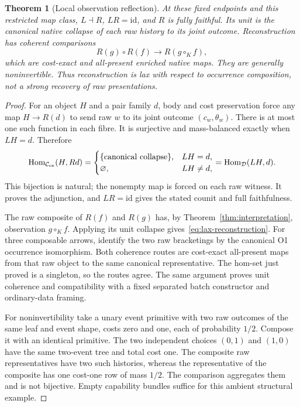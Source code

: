 \documentclass[11pt,a4paper]{article}
\newtheorem{theorem}{Theorem}[section]
\theoremstyle{definition}
\newcommand{\id}{\mathrm{id}}
\begin{document}
\begin{theorem}[Local observation reflection]\label{thm:reflection}
At these fixed endpoints and this restricted map class, $L\dashv R$,
$LR=\id$, and $R$ is fully faithful. Its unit is the canonical native
collapse of each raw history to its joint outcome. Reconstruction has
coherent comparisons
\begin{equation}\label{eq:lax-reconstruction}
 R(g)\circ R(f)\longrightarrow R(g\circ_K f),
\end{equation}
which are cost-exact and all-present enriched native maps. They are
generally noninvertible. Thus reconstruction is lax with respect to
occurrence composition, not a strong recovery of raw presentations.
\end{theorem}
\begin{proof}
For an object $H$ and a pair family $d$, body and cost preservation force
any map $H\to R(d)$ to send raw $w$ to its joint outcome
$(c_w,\theta_w)$. There is at most one such function in each fibre.
It is surjective and mass-balanced exactly when $LH=d$. Therefore
\[
 \operatorname{Hom}_{\mathcal C_{\rm ex}}(H,Rd)
  =\begin{cases}\{\text{canonical collapse}\},&LH=d,\\
                \varnothing,&LH\neq d,
    \end{cases}
 =\operatorname{Hom}_{\mathcal D}(LH,d).
\]
This bijection is natural; the nonempty map is forced on each raw
witness. It proves the adjunction, and $LR=\id$ gives the stated
counit and full faithfulness.

The raw composite of $R(f)$ and $R(g)$ has, by
Theorem~\ref{thm:interpretation}, observation $g\circ_K f$. Applying
its unit collapse gives~\eqref{eq:lax-reconstruction}. For three
composable arrows, identify the two raw bracketings by the canonical
O1 occurrence isomorphism. Both coherence routes are cost-exact
all-present maps from that raw object to the same canonical representative.
The hom-set just proved is a singleton, so the routes agree. The same
argument proves unit coherence and compatibility with a fixed separated
batch constructor and ordinary-data framing.

For noninvertibility take a unary event primitive with two raw outcomes
of the same leaf and event shape, costs zero and one, each of probability
$1/2$. Compose it with an identical primitive. The two independent choices
$(0,1)$ and $(1,0)$ have the same two-event tree and total cost one.
The composite raw representatives have two such histories, whereas the
representative of the composite has one cost-one row of mass $1/2$.
The comparison aggregates them and is not bijective. Empty capability
bundles suffice for this ambient structural example.
\end{proof}
\end{document}
